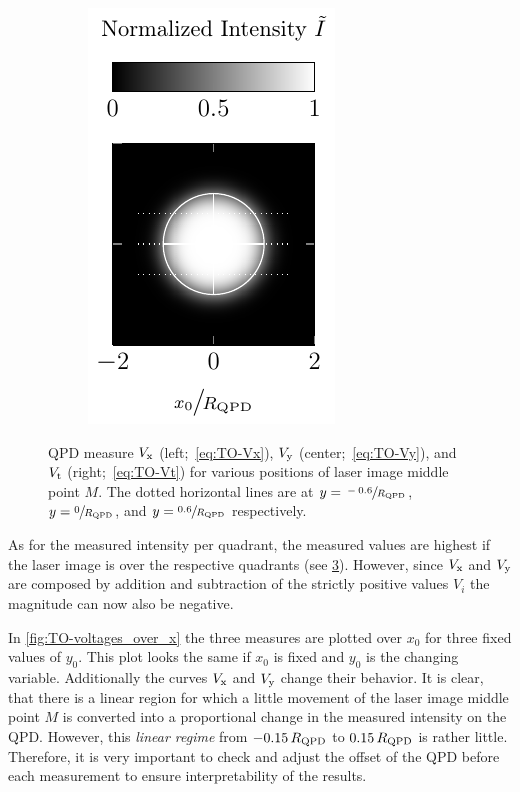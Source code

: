 \begin{figure}
\begin{subfigure}[b]{0.3\textwidth}
    \label{fig:TO-QPDy}
  \end{subfigure}
  \hfill
  \begin{subfigure}[b]{0.3\textwidth}
    \centering
    \includegraphics[]{Plots/cache/QPDt.pdf}
    \label{fig:TO-QPDt}
  \end{subfigure}
  \caption{QPD measure $V_{\mathrm{x}}$ (left;~\cref{eq:TO-Vx}), $V_{\mathrm{y}}$ 
    (center;~\cref{eq:TO-Vy}), and $V_{\mathrm{t}}$ (right;~\cref{eq:TO-Vt}) for 
    various positions of laser image middle point $M$. The dotted horizontal 
    lines are at $y=\sfrac{-0.6}{R_{\mathrm{QPD}}}$, $y=\sfrac{0}{R_{\mathrm{QPD}}}$, 
  and $y=\sfrac{0.6}{R_{\mathrm{QPD}}}$ respectively.}
  \label{fig:TO-QPDs}
 \end{figure}

As for the measured intensity per quadrant, the measured values are highest if 
the laser image is over the respective quadrants (see \cref{fig:TO-QPDs}). 
However, since $V_{\mathrm{x}}$ and $V_{\mathrm{y}}$ are composed by addition and 
subtraction of the strictly positive values $V_{i}$ the magnitude can now also 
be negative.

In \cref{fig:TO-voltages_over_x} the three measures are plotted over $x_{0}$ 
for three fixed values of $y_{0}$. This plot looks the same if $x_{0}$ is fixed 
and $y_{0}$ is the changing variable. Additionally the curves $V_{\mathrm{x}}$ and 
$V_{\mathrm{y}}$ change their behavior. It is clear, that there is a linear region 
for which a little movement of the laser image middle point $M$ is converted 
into a proportional change in the measured intensity on the QPD. However, this 
\emph{linear regime} from $-0.15\,R_{\mathrm{QPD}}$ to $0.15\,R_{\mathrm{QPD}}$ is 
rather little. Therefore, it is very important to check and adjust the offset 
of the QPD before each measurement to ensure interpretability of the results.

